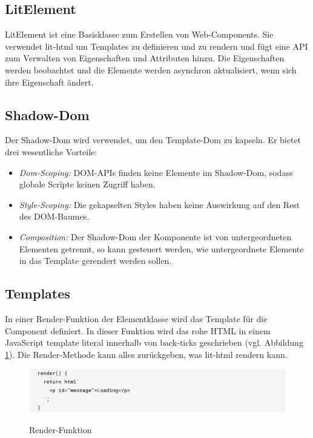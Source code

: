 \documentclass[12pt,					%
							 oneside,			%
							 a4paper,			%
							 halfparskip,		%
							 liststotoc,			%
							 bibtotoc,			%
							 fleqn,				%
							 pointlessnumbers]	%
							 {scrreprt}
\begin{document}
				\subsection{LitElement}
				LitElement ist eine Basisklasse zum Erstellen von Web-Components. Sie verwendet lit-html um Templates zu definieren und zu rendern und fügt eine API zum Verwalten von Eigenschaften und Attributen hinzu.  Die Eigenschaften werden beobachtet und die Elemente werden asynchron aktualisiert, wenn sich ihre Eigenschaft ändert. 

					\subsection{Shadow-Dom}
					Der Shadow-Dom wird verwendet, um den Template-Dom zu kapseln. Er bietet drei wesentliche Vorteile: 
					\begin{itemize}
						\item \textit{Dom-Scoping:} DOM-APIs finden keine Elemente im Shadow-Dom, sodass globale Scripte keinen Zugriff haben.
						\item \textit{Style-Scoping:} Die gekapselten Styles haben keine Auswirkung auf den Rest des DOM-Baumes.
						\item \textit{Composition:} Der Shadow-Dom der Komponente ist von untergeordneten Elementen getrennt, so kann gesteuert werden, wie untergeordnete Elemente in das Template gerendert werden sollen.\cite{webcom}
					\end{itemize}
					\subsection{Templates}
					In einer Render-Funktion der Elementklasse wird das Template für die Component definiert. In dieser Funktion wird das rohe HTML in einem JavaScript template literal innerhalb von back-ticks geschrieben (vgl. Abbildung \ref{Render-Funktion}). Die Render-Methode kann alles zurückgeben, was lit-html rendern kann. \cite{litelem}
					\begin{figure}[h]
						\centering
						\includegraphics[width=1\textwidth]{pictures/render-function}
						\caption{Render-Funktion}\cite{litelem}
						\label{Render-Funktion}
					\end{figure}
				
\end{document}
